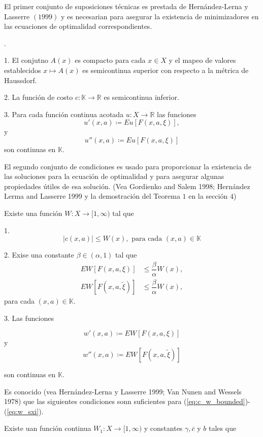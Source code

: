 \documentclass[11pt, spanish]{amsart}
\begin{document}
El primer conjunto de suposiciones técnicas es prestada de Hernández-Lerna
y Lasserre $\left(1999\right)$ y es necesarian para asegurar la existencia
de minimizadores en las ecuaciones de optimalidad correspondientes.
\begin{assumption}
.\label{assu:Sup1}

1. El conjutno $A\left(x\right)$ es compacto para cada $x\in X$
y el mapeo de valores establecidos $x\mapsto A\left(x\right)$ es
semicontinua superior con respecto a la métrica de Haussdorf.

2. La función de costo $c:\mathbb{K}\to\mathbb{R}$ es semicontinua
inferior. 

3. Para cada función continua acotada $u:X\to\mathbb{R}$ las funciones
\[
u'\left(x,a\right)\coloneqq Eu\left[F\left(x,a,\xi\right)\right],
\]
y 
\[
u''\left(x,a\right)\coloneqq Eu\left[F\left(x,a,\xi\right)\right]
\]
son continuas en $\mathbb{K}$. 
\end{assumption}
%
El segundo conjunto de condiciones es usado para proporcionar la existencia
de las soluciones para la ecuación de optimalidad y para asegurar
algunas propiedades útiles de esa solución. (Vea Gordienko and Salem
1998; Hernández Lerma and Lasserre 1999 y la demostración del Teorema
$1$ en la sección $4$)
\begin{assumption}
\label{assu:Sup2}Existe una función $W:X\to[1,\infty)$ tal que

1. 
\begin{equation}
\left|c\left(x,a\right)\right|\leq W\left(x\right),\text{ para cada }\left(x,a\right)\in\mathbb{K}\label{eq:c_w_bounded}
\end{equation}

2. Exise una constante $\beta\in\left(\alpha,1\right)$ tal que 
\begin{align}
EW\left[F\left(x,a,\xi\right)\right] & \leq\dfrac{\beta}{\alpha}W\left(x\right),\label{eq:W_xi}\\
EW\left[F\left(x,a,\widetilde{\xi}\right)\right] & \leq\dfrac{\beta}{\alpha}W\left(x\right),\label{eq:w_sxi}
\end{align}
para cada $\left(x,a\right)\in\mathbb{K}$. 

3. Las funciones 

\[
w'\left(x,a\right)\coloneqq EW\left[F\left(x,a,\xi\right)\right]
\]
y 
\[
w''\left(x,a\right)\coloneqq EW\left[F\left(x,a,\widetilde{\xi}\right)\right]
\]

son continuas en $\mathbb{K}$. 
\end{assumption}
%
\begin{rem}
Es conocido (vea Hernández-Lerna y Lasserre 1999; Van Nunen and Wessels
1978) que las siguientes condiciones sonn suficientes para (\ref{eq:c_w_bounded})-(\ref{eq:w_sxi}).

Existe uan función continua $W_{1}:X\to[1,\infty)$ y constantes $\gamma,\overline{c}$
y $b$ tales que 
\end{rem}
\end{document}
